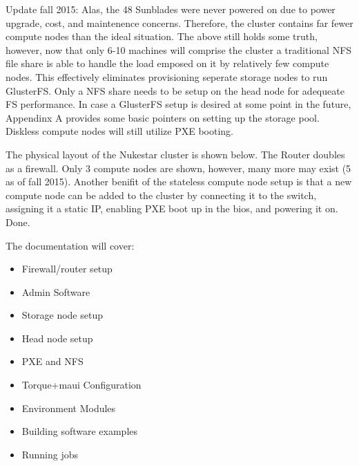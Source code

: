 \documentclass[letterpaper,10pt,english]{sphinxmanual}
\begin{document}
Update fall 2015: Alas, the 48 Sunblades were never powered on due to power upgrade, cost, and
maintenence concerns.  Therefore, the cluster contains far fewer compute nodes than the ideal situation.
The above still holds some truth, however, now that only 6-10 machines will comprise the cluster
a traditional NFS file share is able to handle the load emposed on it by relatively few
compute nodes.  This effectively eliminates provisioning seperate storage nodes to run GlusterFS.
Only a NFS share needs to be setup on the head node for adequeate FS performance.  In case a GlusterFS setup
is desired at some point in the future, Appendinx A provides some basic pointers on setting up the storage pool.
Diskless compute nodes will still utilize PXE booting.

The physical layout of the Nukestar cluster is shown below.  The Router doubles as a firewall.  Only
3 compute nodes are shown, however, many more may exist (5 as of fall 2015).  Another benifit of the
stateless compute node setup is that a new compute node can be added to the cluster by connecting it to the
switch, assigning it a static IP, enabling PXE boot up in the bios, and powering it on.  Done.

{\hfill{}\hfill}

The documentation will cover:
\begin{itemize}
\item {} 
Firewall/router setup

\item {} 
Admin Software

\item {} 
Storage node setup

\item {} 
Head node setup

\item {} 
PXE and NFS

\item {} 
Torque+maui Configuration

\item {} 
Environment Modules

\item {} 
Building software examples

\item {} 
Running jobs

\end{itemize}
\end{document}
